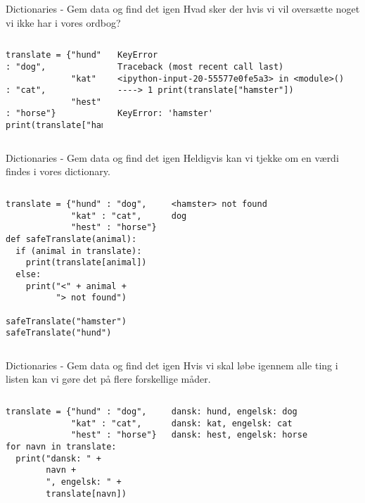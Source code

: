 \begin{frame}[fragile]{Dictionaries - Gem data og find det igen}
	Hvad sker der hvis vi vil oversætte noget vi ikke har i vores ordbog?
	\begin{columns}
		\begin{lstlisting}[style=python]
translate = {"hund" : "dog", 
             "kat" : "cat", 
             "hest" : "horse"}
print(translate["hamster"])
		\end{lstlisting}
		
		\pause
		\begin{lstlisting}[style=python]
KeyError                                  Traceback (most recent call last)
<ipython-input-20-55577e0fe5a3> in <module>()
----> 1 print(translate["hamster"])

KeyError: 'hamster'
		\end{lstlisting}
	\end{columns}	
\end{frame}


\begin{frame}[fragile]{Dictionaries - Gem data og find det igen}
	Heldigvis kan vi tjekke om en værdi findes i vores dictionary.
	\begin{columns}
		\column{0.5\textwidth}
		\begin{lstlisting}[style=python]
translate = {"hund" : "dog", 
             "kat" : "cat", 
             "hest" : "horse"}
def safeTranslate(animal):
  if (animal in translate):
    print(translate[animal])
  else:
    print("<" + animal + 
          "> not found")
		
safeTranslate("hamster")
safeTranslate("hund")
		\end{lstlisting}

		\pause
		\column{0.4\textwidth}
		\begin{lstlisting}[style=python]
<hamster> not found
dog
		\end{lstlisting}
	\end{columns}	
\end{frame}

\begin{frame}[fragile]{Dictionaries - Gem data og find det igen}
	Hvis vi skal løbe igennem alle ting i listen kan vi gøre det på flere forskellige måder.
	\begin{columns}
		\begin{lstlisting}[style=python]
translate = {"hund" : "dog", 
             "kat" : "cat", 
             "hest" : "horse"}
for navn in translate:
  print("dansk: " + 
        navn + 
        ", engelsk: " + 
        translate[navn])
		\end{lstlisting}
		
		\pause
		\column{0.45\textwidth}
		\begin{lstlisting}[style=python]
dansk: hund, engelsk: dog
dansk: kat, engelsk: cat
dansk: hest, engelsk: horse
		\end{lstlisting}
	\end{columns}	
\end{frame}

